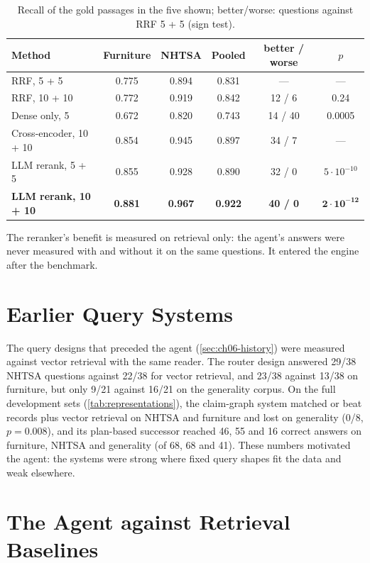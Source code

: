 \begin{table}[htbp]
\centering
\caption{Recall of the gold passages in the five shown; better/worse: questions against RRF 5 + 5 (sign test).}
\label{tab:rerank}
\small
\begin{tabular}{@{}lccccc@{}}
\toprule
Method & Furniture & NHTSA & Pooled & better / worse & $p$ \\
\midrule
RRF, 5 + 5 & 0.775 & 0.894 & 0.831 & --- & --- \\
RRF, 10 + 10 & 0.772 & 0.919 & 0.842 & 12 / 6 & 0.24 \\
Dense only, 5 & 0.672 & 0.820 & 0.743 & 14 / 40 & 0.0005 \\
Cross-encoder, 10 + 10 & 0.854 & 0.945 & 0.897 & 34 / 7 & --- \\
LLM rerank, 5 + 5 & 0.855 & 0.928 & 0.890 & 32 / 0 & $5 \cdot 10^{-10}$ \\
\textbf{LLM rerank, 10 + 10} & \textbf{0.881} & \textbf{0.967} & \textbf{0.922} & \textbf{40 / 0} & $\mathbf{2 \cdot 10^{-12}}$ \\
\bottomrule
\end{tabular}
\end{table}

The reranker's benefit is measured on retrieval only: the agent's answers were never measured with and without it on
the same questions. It entered the engine after the benchmark.

\section{Earlier Query Systems}\label{sec:ch07-earlier}

The query designs that preceded the agent (\cref{sec:ch06-history}) were measured against vector retrieval with the
same reader. The router design answered 29/38 NHTSA questions against 22/38 for vector retrieval, and 23/38 against
13/38 on furniture, but only 9/21 against 16/21 on the generality corpus. On the full development sets
(\cref{tab:representations}), the claim-graph system matched or beat records plus vector retrieval on NHTSA and
furniture and lost on generality (0/8, $p = 0.008$), and its plan-based successor reached 46, 55 and 16 correct answers
on furniture, NHTSA and generality (of 68, 68 and 41). These numbers motivated the agent: the systems were strong where
fixed query shapes fit the data and weak elsewhere.

\section{The Agent against Retrieval Baselines}\label{sec:ch07-baselines}

